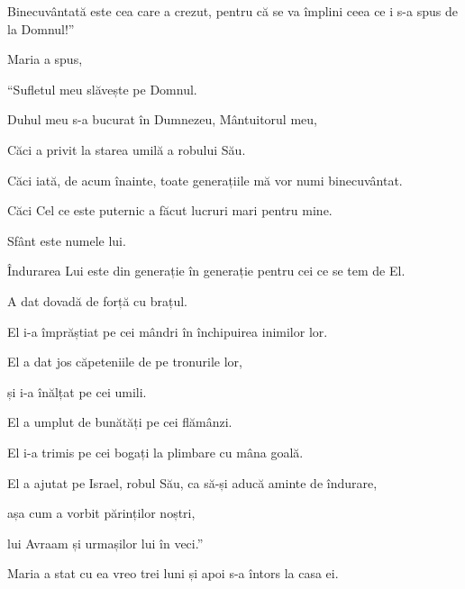 {Binecuvântată este cea care a crezut, pentru că se va împlini ceea ce i s-a spus de la Domnul!”


\par }{\PP {}Maria a spus,

\par }{\Q “Sufletul meu slăvește pe Domnul.


\par }{\QB {}Duhul meu s-a bucurat în Dumnezeu, Mântuitorul meu,


\par }{\QB {}Căci a privit la starea umilă a robului Său.

\par }{\Q Căci iată, de acum înainte, toate generațiile mă vor numi binecuvântat.


\par }{\QB {}Căci Cel ce este puternic a făcut lucruri mari pentru mine.

\par }{\QB Sfânt este numele lui.


\par }{\QB {}Îndurarea Lui este din generație în generație pentru cei ce se tem de El.


\par }{\Q {}A dat dovadă de forță cu brațul.

\par }{\QB El i-a împrăștiat pe cei mândri în închipuirea inimilor lor.


\par }{\Q {}El a dat jos căpeteniile de pe tronurile lor,

\par }{\QB și i-a înălțat pe cei umili.


\par }{\Q {}El a umplut de bunătăți pe cei flămânzi.

\par }{\QB El i-a trimis pe cei bogați la plimbare cu mâna goală.


\par }{\Q {}El a ajutat pe Israel, robul Său, ca să-și aducă aminte de îndurare,


\par }{\QB {}așa cum a vorbit părinților noștri,

\par }{\QB lui Avraam și urmașilor lui în veci.”


\par }{\PP {}Maria a stat cu ea vreo trei luni și apoi s-a întors la casa ei.


}
